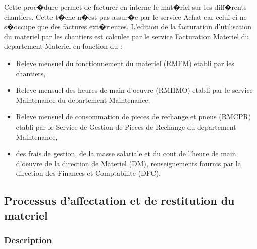 \documentclass{article}
\begin{document}
				Cette proc�dure permet de facturer en interne le mat�riel sur les diff�rents chantiers. Cette t�che n�est pas assur�e par le service Achat car celui-ci ne s�occupe que des factures ext�rieures.
				\newline
				L'edition de la facturation d'utilisation du materiel par les chantiers est calculee par le service
Facturation Materiel du departement Materiel en fonction du :
				\begin{itemize}
						    \item Releve mensuel du fonctionnement du materiel (RMFM) etabli par les chantiers,
						    \item Releve mensuel des heures de main d'oeuvre (RMHMO) etabli par le service Maintenance
du departement Maintenance,
						    \item Releve mensuel de consommation de pieces de rechange et pneus (RMCPR) etabli par le Service de Gestion de Pieces de Rechange du departement Maintenance,
						    \item des frais de gestion, de la masse salariale et du cout de l'heure de main d'oeuvre de la
direction de Materiel (DM), renseignements fournis par la direction des Finances et Comptabilite (DFC).
				\end{itemize}
				
				
				

		\subsection{Processus d'affectation et de restitution du materiel}
				\subsubsection{Description}
				
\end{document}
